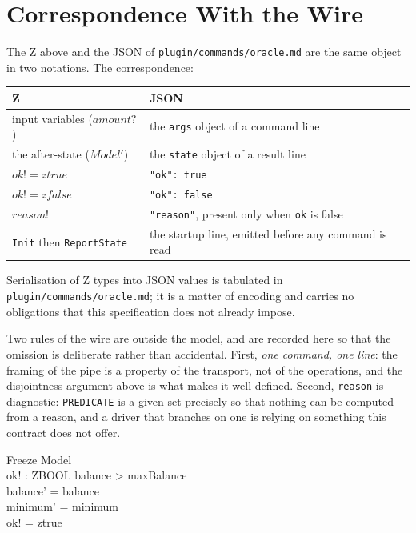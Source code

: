 \documentclass[a4paper,10pt,fleqn]{article}
\begin{document}
\section{Correspondence With the Wire}

The Z above and the JSON of \texttt{plugin/commands/oracle.md} are the same
object in two notations. The correspondence:

\begin{center}
\begin{tabular}{ll}
  \textbf{Z} & \textbf{JSON} \\
  \hline
  input variables ($amount?$)     & the \texttt{args} object of a command line \\
  the after-state ($Model'$)      & the \texttt{state} object of a result line \\
  $ok! = ztrue$                   & \texttt{"ok": true} \\
  $ok! = zfalse$                  & \texttt{"ok": false} \\
  $reason!$                       & \texttt{"reason"}, present only when \texttt{ok} is false \\
  \texttt{Init} then \texttt{ReportState} & the startup line, emitted before any command is read \\
\end{tabular}
\end{center}

Serialisation of Z types into JSON values is tabulated in
\texttt{plugin/commands/oracle.md}; it is a matter of encoding and carries no
obligations that this specification does not already impose.

Two rules of the wire are outside the model, and are recorded here so
that the omission is deliberate rather than accidental. First,
\emph{one command, one line}: the framing of the pipe is a property of
the transport, not of the operations, and the disjointness argument above
is what makes it well defined. Second, \texttt{reason} is diagnostic:
\texttt{PREDICATE} is a given set precisely so that nothing can be
computed from a reason, and a driver that branches on one is relying on
something this contract does not offer.

\begin{schema}{Freeze}
  \Delta Model \\
  ok! : ZBOOL
  \where
  balance > maxBalance \\
  balance' = balance \\
  minimum' = minimum \\
  ok! = ztrue
\end{schema}
\end{document}
